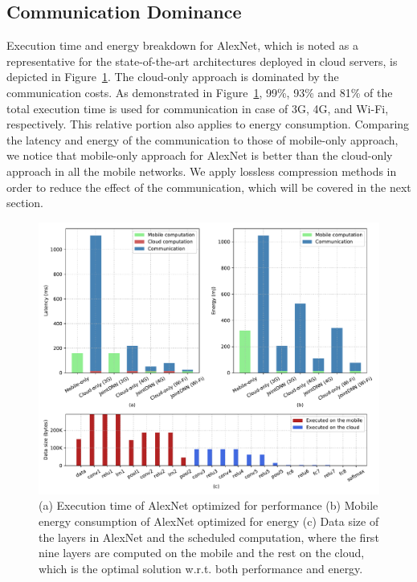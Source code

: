 \subsection{Communication Dominance}
Execution time and energy breakdown for AlexNet, which is noted as a representative for the state-of-the-art architectures deployed in cloud servers, is depicted in Figure~\ref{alexnet_extracted}. The cloud-only approach is dominated by the communication costs. As demonstrated in Figure~\ref{alexnet_extracted}, 99\%, 93\% and 81\% of the total execution time is used for communication in case of 3G, 4G, and Wi-Fi, respectively. This relative portion also applies to energy consumption. Comparing the latency and energy of the communication to those of mobile-only approach, we notice that mobile-only approach for AlexNet is better than the cloud-only approach in all the mobile networks. We apply lossless compression methods in order to reduce the effect of the communication, which will be covered in the next section. 

\begin{figure}[t]
\centering
\includegraphics[width=\linewidth]{alexnet_extracted}
\caption{(a) Execution time of AlexNet optimized for performance (b) Mobile energy consumption of AlexNet optimized for energy (c) Data size of the layers in AlexNet and the scheduled computation, where the first nine layers are computed on the mobile and the rest on the cloud, which is the optimal solution w.r.t. both performance and energy.}
\label{alexnet_extracted}
\end{figure}


